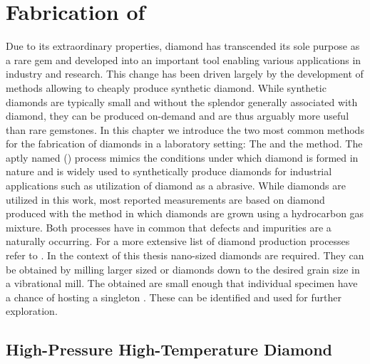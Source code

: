 
\chapter{Fabrication of \Nds}	\label{ch::fabrication_nanodiamonds}


	Due to its extraordinary properties, diamond has transcended its sole purpose as a rare gem and developed into an important tool enabling various applications in industry and research. This change has been driven largely by the development of methods allowing to cheaply produce synthetic diamond. While synthetic diamonds are typically small and without the splendor generally associated with diamond, they can be produced on-demand and are thus arguably more useful than rare gemstones.
	In this chapter we introduce the two most common methods for the fabrication of diamonds in a laboratory setting: The \hpht and the \cvd method.
	The aptly named \hpht (\HPHT) process mimics the conditions under which diamond is formed in nature and is widely used to synthetically produce diamonds for industrial applications such as utilization of diamond as a abrasive.
	While \HPHT diamonds are utilized in this work, most reported measurements are based on diamond produced with the \CVD method in which diamonds are grown using a hydrocarbon gas mixture. Both processes have in common that defects and impurities are a naturally occurring.
	For a more extensive list of diamond production processes refer to \cite{davis1993diamond}.
	In the context of this thesis nano-sized diamonds are required. They can be obtained by milling larger sized \HPHT or \CVD diamonds down to the desired grain size in a vibrational mill.
	The obtained \nds are small enough that individual specimen have a chance of hosting a singleton \siv. These can be identified and used for further exploration.

\section[HPHT]{High-Pressure High-Temperature Diamond}\label{sec::hpht}

